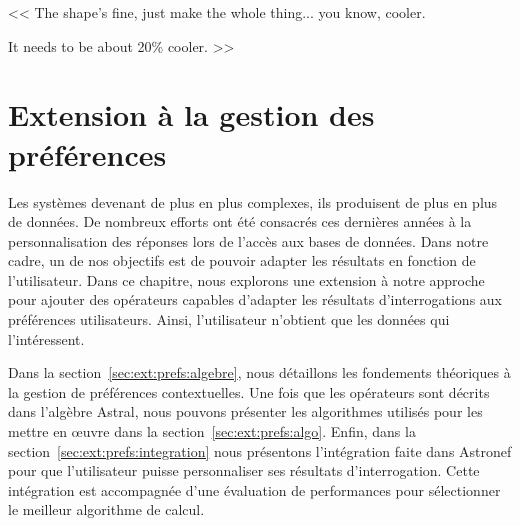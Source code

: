 \begin{savequote}[6cm]
<< The shape's fine, just make the whole thing... you know, cooler. 

\quad It needs to be about 20\% cooler. >>
\end{savequote}
\chapter{Extension à la gestion des préférences}\label{chap:prefs}
\chaptertoc

Les systèmes devenant de plus en plus complexes, ils produisent de plus en plus de données. De nombreux efforts ont été consacrés ces dernières années à la personnalisation des réponses lors de l'accès aux bases de données. Dans notre cadre, un de nos objectifs est de pouvoir adapter les résultats en fonction de l'utilisateur. Dans ce chapitre, nous explorons une extension à notre approche pour ajouter des opérateurs capables d'adapter les résultats d'interrogations aux préférences utilisateurs. Ainsi, l'utilisateur n'obtient que les données qui l'intéressent.

Dans la section~\ref{sec:ext:prefs:algebre}, nous détaillons les fondements théoriques à la gestion de préférences contextuelles. Une fois que les opérateurs sont décrits dans l'algèbre Astral, nous pouvons présenter les algorithmes utilisés pour les mettre en œuvre dans la section~\ref{sec:ext:prefs:algo}. Enfin, dans la section~\ref{sec:ext:prefs:integration} nous présentons l'intégration faite dans Astronef pour que l'utilisateur puisse personnaliser ses résultats d'interrogation. Cette intégration est accompagnée d'une évaluation de performances pour sélectionner le meilleur algorithme de calcul.





